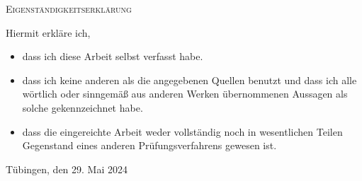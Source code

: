 \begin{center}
  \textsc{Eigenständigkeitserklärung}
\end{center}
%
\noindent
%
Hiermit erkläre ich,

\begin{itemize}
  \item dass ich diese Arbeit selbst verfasst habe.
  \item dass ich keine anderen als die angegebenen Quellen benutzt und dass ich
  alle wörtlich oder sinngemäß aus anderen Werken übernommenen Aussagen als
  solche gekennzeichnet habe.
  \item dass die eingereichte Arbeit weder vollständig noch in wesentlichen 
  Teilen Gegenstand eines anderen Prüfungsverfahrens gewesen ist.
\end{itemize}
%
Tübingen, den 29. Mai 2024
